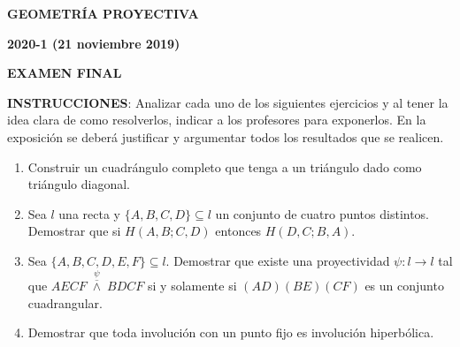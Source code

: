 \documentclass[12pt]{report}
\begin{document}
\begin{center}
\textbf{\LARGE {GEOMETRÍA PROYECTIVA}}
\end{center}

\begin{center}
\textbf{{\large 2020-1 (21 noviembre 2019)}}
\end{center}

\begin{center}
\textbf{{\large EXAMEN FINAL}}
\end{center}

{\bf INSTRUCCIONES}: Analizar cada uno de los siguientes ejercicios y al tener la idea clara de como resolverlos, indicar a los profesores para exponerlos. En la exposición se deberá justificar y argumentar todos los resultados que se realicen.

\begin{enumerate}

\item Construir un cuadrángulo completo que tenga a un triángulo dado como triángulo diagonal.

\item Sea $l$ una recta y $\{A,B,C,D\} \subseteq l$ un conjunto de cuatro puntos distintos. Demostrar que si $H(A,B;C,D)$ entonces $H(D,C; B,A)$.

\item Sea $\{A,B,C,D,E,F\} \subseteq l$. Demostrar que existe una proyectividad $\psi:l \to l$ tal que \linebreak $AECF\;\overset{\psi}{\overline{\wedge}}\; BDCF$ si y solamente si $(AD)(BE)(CF)$ es un conjunto cuadrangular.

\item Demostrar que toda involución con un punto fijo es involución hiperbólica.

\end{enumerate}
\end{document}
